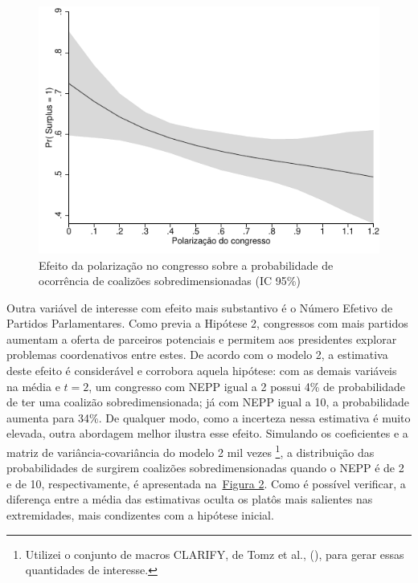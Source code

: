 \begin{figure}[htb]
	\label{fig:figura1}
	\caption{Efeito da polarização no congresso sobre a probabilidade de ocorrência de coalizões sobredimensionadas (IC 95\%)}
	\begin{center}
	    \includegraphics[scale=1.5]{polarization.pdf}
	\end{center}
\end{figure}


Outra variável de interesse com efeito mais substantivo é o Número Efetivo de Partidos Parlamentares. Como previa a Hipótese 2, congressos com mais partidos aumentam a oferta de parceiros potenciais e permitem aos presidentes explorar problemas coordenativos entre estes. De acordo com o modelo 2, a estimativa deste efeito é considerável e corrobora aquela hipótese: com as demais variáveis na média e $t = 2$, um congresso com NEPP igual a 2 possui 4\% de probabilidade de ter uma coalizão sobredimensionada; já com NEPP igual a 10, a probabilidade aumenta para 34\%. De qualquer modo, como a incerteza nessa estimativa é muito elevada, outra abordagem melhor ilustra esse efeito. Simulando os coeficientes e a matriz de variância-covariância do modelo 2 mil vezes \footnote{Utilizei o conjunto de macros CLARIFY, de Tomz et al., (\citeyear{tomz2003}), para gerar essas quantidades de interesse.}, a distribuição das probabilidades de surgirem coalizões sobredimensionadas quando o NEPP é de 2 e de 10, respectivamente, é apresentada na~\hyperref[fig:figura2]{Figura 2}. Como é possível verificar, a diferença entre a média das estimativas oculta os platôs mais salientes nas extremidades, mais condizentes com a hipótese inicial.

